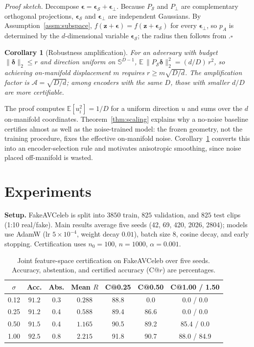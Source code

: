 \documentclass{article}
\def\z{{\mathbf z}}
\def\eps{{\boldsymbol \epsilon}}
\def\del{{\boldsymbol \delta}}
\newcommand{\Smanifold}{\mathcal{S}}
\newtheorem{corollary}{Corollary}
\begin{document}
\noindent\emph{Proof sketch.} Decompose $\eps=\eps_\Smanifold+\eps_\perp$. Because $P_\Smanifold$ and $P_\perp$ are complementary orthogonal projections, $\eps_\Smanifold$ and $\eps_\perp$ are independent Gaussians. By Assumption~\ref{assm:subspace}, $f(\z+\eps)=f(\z+\eps_\Smanifold)$ for every $\eps_\perp$, so $p_A$ is determined by the $d$-dimensional variable $\eps_\Smanifold$; the radius then follows from \cite{cohen2019certified}.\hfill$\square$

\begin{corollary}[Robustness amplification]
\label{cor:amp}
For an adversary with budget $\|\del\|_2\le r$ and direction uniform on $\mathbb{S}^{D-1}$, $\mathbb{E}\,\|P_\Smanifold\del\|_2^2=(d/D)\,r^2$, so achieving on-manifold displacement $m$ requires $r\ge m\sqrt{D/d}$. The amplification factor is $\mathcal{A}=\sqrt{D/d}$; among encoders with the same $D$, those with smaller $d/D$ are more certifiable.
\end{corollary}

The proof computes $\mathbb{E}[u_i^2]=1/D$ for a uniform direction $u$ and sums over the $d$ on-manifold coordinates. Theorem~\ref{thm:scaling} explains why a no-noise baseline certifies almost as well as the noise-trained model: the frozen geometry, not the training procedure, fixes the effective on-manifold noise. Corollary~\ref{cor:amp} converts this into an encoder-selection rule and motivates anisotropic smoothing, since noise placed off-manifold is wasted.

\section{Experiments}
\label{sec:experiments}

\noindent\textbf{Setup.} FakeAVCeleb \cite{khalid2021fakeavceleb} is split into $3850$ train, $825$ validation, and $825$ test clips (1:10 real/fake). Main results average five seeds (42, 69, 420, 2026, 2804); models use AdamW (lr $5\!\times\!10^{-4}$, weight decay $0.01$), batch size 8, cosine decay, and early stopping. Certification uses $n_0=100$, $n=1000$, $\alpha=0.001$.

\begin{table}[t]
\centering
\caption{Joint feature-space certification on FakeAVCeleb over five seeds. Accuracy, abstention, and certified accuracy (C@$r$) are percentages.}
\label{tab:main}
\scriptsize
\setlength{\tabcolsep}{2.4pt}
\begin{tabular}{ccccccc}
\toprule
$\sigma$ & Acc. & Abs. & Mean $R$ & C@0.25 & C@0.50 & C@1.00 / 1.50 \\
\midrule
0.12 & $91.2$ & 0.3 & $0.288$ & 88.8 & 0.0 & 0.0 / 0.0 \\
0.25 & $91.2$ & 0.4 & $0.588$ & 89.4 & 86.6 & 0.0 / 0.0 \\
0.50 & $91.5$ & 0.4 & $1.165$ & 90.5 & 89.2 & 85.4 / 0.0 \\
1.00 & $92.5$ & 0.8 & $2.215$ & 91.8 & 90.7 & 88.0 / 84.9 \\
\bottomrule
\end{tabular}
\vspace{-0.2cm}
\end{table}
\end{document}
